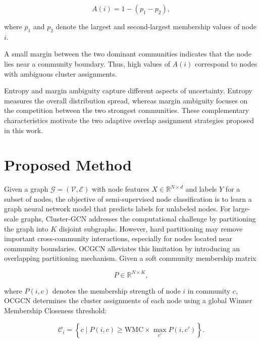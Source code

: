 \documentclass[pdflatex,sn-mathphys-num]{sn-jnl}%
\theoremstyle{thmstyleone}%
\theoremstyle{thmstyletwo}%
\theoremstyle{thmstylethree}%
\begin{document}
\begin{equation}
A(i)=1-(p_1-p_2),
\label{eq:ambiguity}
\end{equation}

where $p_1$ and $p_2$ denote the largest and second-largest membership values of node $i$.

A small margin between the two dominant communities indicates that the node lies near a community boundary.
Thus, high values of $A(i)$ correspond to nodes with ambiguous cluster assignments.

Entropy and margin ambiguity capture different aspects of uncertainty.
Entropy measures the overall distribution spread, whereas margin ambiguity focuses on the competition between the two strongest communities.
These complementary characteristics motivate the two adaptive overlap assignment strategies proposed in this work.
\section{Proposed Method}
\label{sec:method}

Given a graph
$\mathcal{G}=(\mathcal{V},\mathcal{E})$
with node features
$X\in\mathbb{R}^{N\times d}$
and labels
$Y$ for a subset of nodes, the objective of semi-supervised node classification is to learn a graph neural network model that predicts labels for unlabeled nodes.
For large-scale graphs, Cluster-GCN addresses the computational challenge by partitioning the graph into $K$ disjoint subgraphs.
However, hard partitioning may remove important cross-community interactions, especially for nodes located near community boundaries.
OCGCN alleviates this limitation by introducing an overlapping partitioning mechanism.
Given a soft community membership matrix

\begin{equation}
P\in\mathbb{R}^{N\times K},
\end{equation}

where $P(i,c)$ denotes the membership strength of node $i$ in community $c$, OCGCN determines the cluster assignments of each node using a global Winner Membership Closeness threshold:

\begin{equation}
\mathcal{C}_i
=
\left\{
c \mid
P(i,c)\geq
\mathrm{WMC}\times
\max_{c'}P(i,c')
\right\}.
\label{eq:ocgcn-assignment}
\end{equation}
\end{document}

